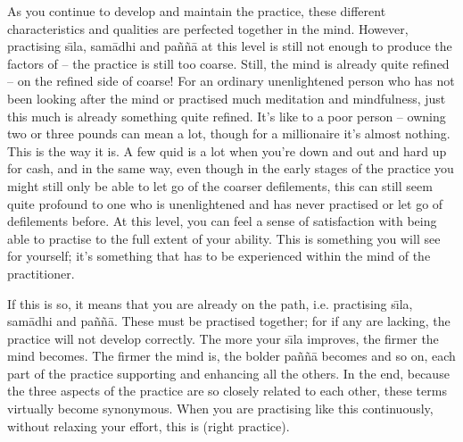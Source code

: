 As you continue to develop and maintain the practice, these different characteristics and qualities are perfected together in the mind. However, practising s\={\i}la, sam\=adhi and pa\~n\~n\=a at this level is still not enough to produce the factors of  -- the practice is still too coarse. Still, the mind is already quite refined -- on the refined side of coarse! For an ordinary unenlightened person who has not been looking after the mind or practised much meditation and mindfulness, just this much is already something quite refined. It's like to a poor person -- owning two or three pounds can mean a lot, though for a millionaire it's almost nothing. This is the way it is. A few quid is a lot when you're down and out and hard up for cash, and in the same way, even though in the early stages of the practice you might still only be able to let go of the coarser defilements, this can still seem quite profound to one who is unenlightened and has never practised or let go of defilements before. At this level, you can feel a sense of satisfaction with being able to practise to the full extent of your ability. This is something you will see for yourself; it's something that has to be experienced within the mind of the practitioner.

If this is so, it means that you are already on the path, i.e. practising s\={\i}la, sam\=adhi and pa\~n\~n\=a. These must be practised together; for if any are lacking, the practice will not develop correctly. The more your s\={\i}la improves, the firmer the mind becomes. The firmer the mind is, the bolder pa\~n\~n\=a becomes and so on, each part of the practice supporting and enhancing all the others. In the end, because the three aspects of the practice are so closely related to each other, these terms virtually become synonymous. When you are practising like this continuously, without relaxing your effort, this is  (right practice).


